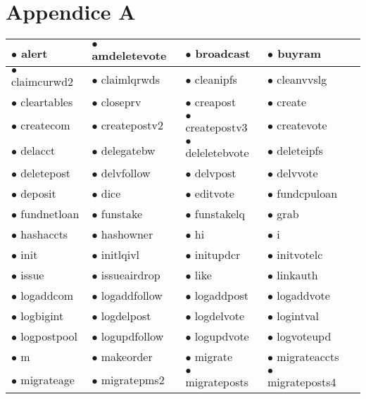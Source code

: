 \appendix
\setcounter{secnumdepth}{-1}
\chapter{Appendice A}
\label{appendix_marker}

\begin{table}[h!]
\centering
\begin{adjustbox}{width=0.6\textwidth}
\small
\begin{tabular}{|l|l|l|l|l|}
\hline
$\bullet$ alert & $\bullet$ amdeletevote & $\bullet$ broadcast & $\bullet$ buyram \\
\hline
$\bullet$ claimcurwd2 & $\bullet$ claimlqrwds & $\bullet$ cleanipfs & $\bullet$ cleanvvslg \\
\hline
$\bullet$ cleartables & $\bullet$ closeprv & $\bullet$ creapost & $\bullet$ create \\
\hline
$\bullet$ createcom & $\bullet$ createpostv2 & $\bullet$ createpostv3 & $\bullet$ createvote \\
\hline
$\bullet$ delacct & $\bullet$ delegatebw & $\bullet$ deleletebvote & $\bullet$ deleteipfs \\
\hline
$\bullet$ deletepost & $\bullet$ delvfollow & $\bullet$ delvpost & $\bullet$ delvvote \\
\hline
$\bullet$ deposit & $\bullet$ dice & $\bullet$ editvote & $\bullet$ fundcpuloan \\
\hline
$\bullet$ fundnetloan & $\bullet$ funstake & $\bullet$ funstakelq & $\bullet$ grab \\
\hline
$\bullet$ hashaccts & $\bullet$ hashowner & $\bullet$ hi & $\bullet$ i \\
\hline
$\bullet$ init & $\bullet$ initlqivl & $\bullet$ initupdcr & $\bullet$ initvotelc \\
\hline
$\bullet$ issue & $\bullet$ issueairdrop & $\bullet$ like & $\bullet$ linkauth \\
\hline
$\bullet$ logaddcom & $\bullet$ logaddfollow & $\bullet$ logaddpost & $\bullet$ logaddvote \\
\hline
$\bullet$ logbigint & $\bullet$ logdelpost & $\bullet$ logdelvote & $\bullet$ logintval \\
\hline
$\bullet$ logpostpool & $\bullet$ logupdfollow & $\bullet$ logupdvote & $\bullet$ logvoteupd \\
\hline
$\bullet$ m & $\bullet$ makeorder & $\bullet$ migrate & $\bullet$ migrateaccts \\
\hline
$\bullet$ migrateage & $\bullet$ migratepms2 & $\bullet$ migrateposts & $\bullet$ migrateposts4 \\

\end{tabular}
\end{adjustbox}
\end{table}
